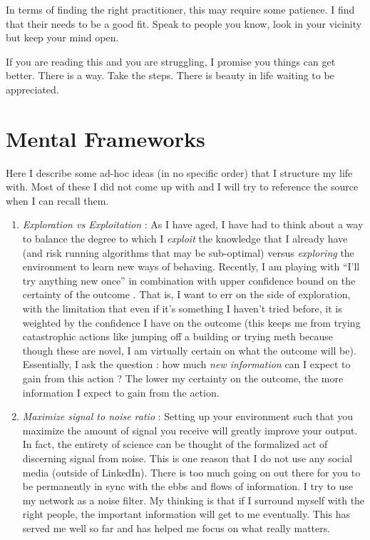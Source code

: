 \documentclass[10pt,twocolumn]{extarticle}
\begin{document}
In terms of finding the right practitioner, this may require some patience. I find that their needs to be a good fit. Speak to people you know, look in your vicinity but keep your mind open. 

If you are reading this and you are struggling, I promise you things can get better. There is a way. Take the steps. There is beauty in life waiting to be appreciated.

\section{Mental Frameworks}
Here I describe some ad-hoc ideas (in no specific order) that I structure my life with. Most of these I did not come up with and I will try to reference the source when I can recall them.

\begin{enumerate}
    \item \textit{Exploration vs Exploitation} : As I have aged, I have had to think about a way to balance the degree to which I \textit{exploit} the knowledge that I already have (and risk running algorithms that may be sub-optimal) versus \textit{exploring} the environment to learn new ways of behaving. Recently, I am playing with ``I'll try anything new once'' in combination with upper confidence bound on the certainty of the outcome \cite{auer2002using}. That is, I want to err on the side of exploration, with the limitation that even if it's something I haven't tried before, it is weighted by the confidence I have on the outcome (this keeps me from trying catastrophic actions like jumping off a building or trying meth because though these are novel, I am virtually certain on what the outcome will be). Essentially, I ask the question : how much \textit{new information} can I expect to gain from this action ? The lower my certainty on the outcome, the more information I expect to gain from the action.
    \item \textit{Maximize signal to noise ratio} : Setting up your environment such that you maximize the amount of signal you receive will greatly improve your output. In fact, the entirety of science can be thought of the formalized act of discerning signal from noise. This is one reason that I do not use any social media (outside of LinkedIn). There is too much going on out there for you to be permanently in sync with the ebbs and flows of information. I try to use my network as a noise filter. My thinking is that if I surround myself with the right people, the important information will get to me eventually. This has served me well so far and has helped me focus on what really matters.

\end{enumerate}
\end{document}
